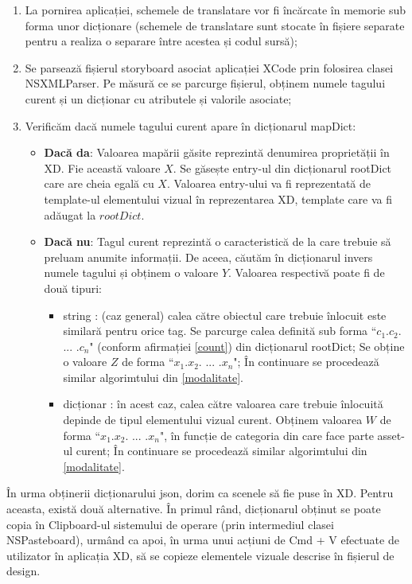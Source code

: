\begin{enumerate} \label{algoritm}
\item La pornirea aplicației, schemele de translatare vor fi încărcate în memorie sub forma unor dicționare (schemele de translatare sunt stocate în fișiere separate pentru a realiza o separare între acestea și codul sursă);
\item Se parsează fișierul storyboard asociat aplicației XCode prin folosirea clasei NSXMLParser. Pe măsură ce se parcurge fișierul, obținem numele tagului curent și un dicționar cu atributele și valorile asociate;
\item Verificăm dacă numele tagului curent apare în dicționarul mapDict:
\begin{itemize}
\item \textbf{Dacă da}: Valoarea mapării găsite reprezintă denumirea proprietății în XD. Fie această valoare $X$. Se găsește entry-ul din dicționarul rootDict care are cheia egală cu $X$. Valoarea entry-ului va fi reprezentată de template-ul elementului vizual în reprezentarea XD, template care va fi adăugat la $rootDict$.
\item \textbf{Dacă nu}: Tagul curent reprezintă o caracteristică de la care trebuie să preluam anumite informații. De aceea, căutăm în dicționarul invers numele tagului și obținem o valoare $Y$. Valoarea respectivă poate fi de două tipuri:
\begin{itemize}
\item string : (caz general) calea către obiectul care trebuie înlocuit este similară pentru orice tag. Se parcurge calea definită sub forma ``$c_1$.$c_2$. ... .$c_n$" (conform afirmației \ref{count}) din dicționarul rootDict; Se obține o valoare $Z$ de forma ``$x_1$.$x_2$. ... .$x_n$"; În continuare se procedează similar algorimtului din \ref{modalitate}.
\item dicționar : în acest caz, calea către valoarea care trebuie înlocuită depinde de tipul elementului vizual curent. Obținem valoarea $W$ de forma ``$x_1$.$x_2$. ... .$x_n$", în funcție de categoria din care face parte asset-ul curent; În continuare se procedează similar algorimtului din \ref{modalitate}.
\end{itemize}
\end{itemize}
\end{enumerate}

În urma obținerii dicționarului json, dorim ca scenele să fie puse în XD. Pentru aceasta, există două alternative. În primul rând, dicționarul obținut se poate copia în Clipboard-ul sistemului de operare (prin intermediul clasei NSPasteboard), urmând ca apoi, în urma unui acțiuni de Cmd + V efectuate de utilizator în aplicația XD, să se copieze elementele vizuale descrise în fișierul de design.

